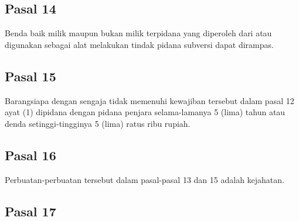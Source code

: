 \documentclass{article}
\begin{document}
\subsection*{\centering{}Pasal 14}

Benda baik milik maupun bukan milik terpidana yang diperoleh dari atau digunakan sebagai alat melakukan
tindak pidana subversi dapat dirampas.

\subsection*{\centering{}Pasal 15}

Barangsiapa dengan sengaja tidak memenuhi kewajiban tersebut dalam pasal 12 ayat (1) dipidana dengan
pidana penjara selama-lamanya 5 (lima) tahun atau denda setinggi-tingginya 5 (lima) ratus ribu rupiah.

\subsection*{\centering{}Pasal 16}

Perbuatan-perbuatan tersebut dalam pasal-pasal 13 dan 15 adalah kejahatan.

\subsection*{\centering{}Pasal 17}
\end{document}
